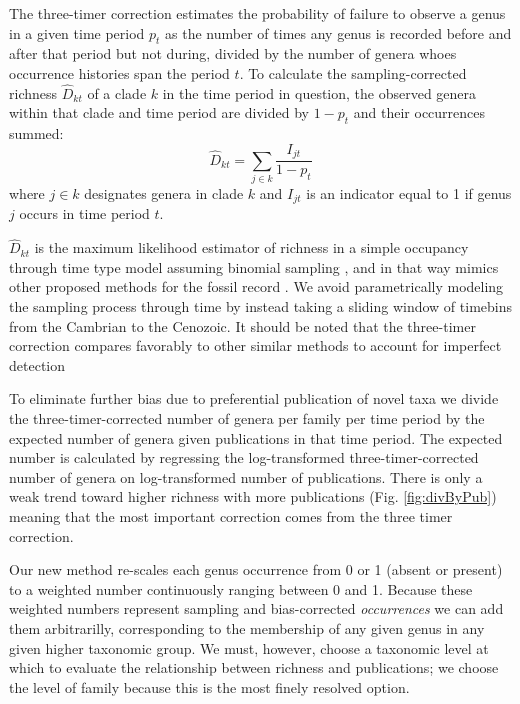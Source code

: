 \documentclass[12pt]{article}
\let\citep=\cite
\begin{document}
The three-timer correction estimates the probability of failure to
observe a genus in a given time period $p_t$ as the number of times
any genus is recorded before and after that period but not during,
divided by the number of genera whoes occurrence histories span the
period $t$.  To calculate the sampling-corrected richness
$\hat{D}_{kt}$ of a clade $k$ in the time period in question, the
observed genera within that clade and time period are divided by
$1 - p_t$ and their occurrences summed:
\begin{equation}
  \hat{D}_{kt} = \sum_{j \in k} \frac{I_{jt}}{1 - p_t}
\end{equation}
where $j \in k$ designates genera in clade $k$ and $I_{jt}$ is an
indicator equal to 1 if genus $j$ occurs in time period $t$.

$\hat{D}_{kt}$ is the maximum likelihood estimator of richness in a
simple occupancy through time type model assuming binomial sampling
\citep{royleDorazio}, and in that way mimics other proposed methods
for the fossil record \citep{foote2016, starrfelt2016}. We avoid
parametrically modeling the sampling process through time by instead
taking a sliding window of timebins from the Cambrian to the
Cenozoic. It should be noted that the three-timer correction compares
favorably to other similar methods to account for imperfect detection
\citep{alroy2014}

To eliminate further bias due to preferential publication of novel
taxa \citep{alroy2010} we divide the three-timer-corrected number of
genera per family per time period by the expected number of genera
given publications in that time period.  The expected number is
calculated by regressing the log-transformed three-timer-corrected
number of genera on log-transformed number of publications. There is
only a weak trend toward higher richness with more publications
(Fig. \ref{fig:divByPub}) meaning that the most important correction
comes from the three timer correction.

Our new method re-scales each genus occurrence from 0 or 1 (absent or
present) to a weighted number continuously ranging between 0 and
1. Because these weighted numbers represent sampling and
bias-corrected {\it occurrences} we can add them arbitrarilly,
corresponding to the membership of any given genus in any given higher
taxonomic group.  We must, however, choose a taxonomic level at which
to evaluate the relationship between richness and publications; we
choose the level of family because this is the most finely resolved
option.
\end{document}
